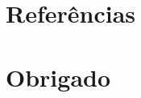 \documentclass[11pt, aspectratio=169]{beamer}
\begin{document}


\section{Referências}

\begin{frame}[allowframebreaks]

  

\end{frame}

\section*{Obrigado}
\end{document}
